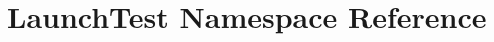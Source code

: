 \hypertarget{namespaceLaunchTest}{\section{Launch\+Test Namespace Reference}
\label{namespaceLaunchTest}
}
